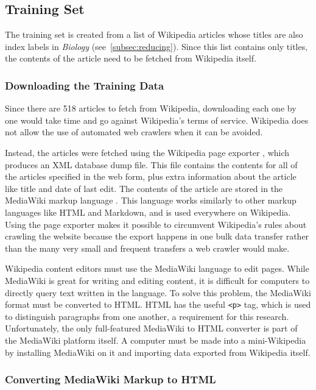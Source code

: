 \subsection{Training Set}
\label{subsec:training-set}

The training set is created from a list of Wikipedia articles whose titles are also index labels in {\it Biology} (see~\ref{subsec:reducing}).
Since this list contains only titles, the contents of the article need to be fetched from Wikipedia itself.

\subsubsection{Downloading the Training Data}

Since there are 518 articles to fetch from Wikipedia, downloading each one by one would take time and go against Wikipedia's terms of service. Wikipedia does not allow the use of automated web crawlers when it can be avoided\cite{wiki-robots}.

Instead, the articles were fetched using the Wikipedia page exporter \cite{wiki-exporter}, which produces an XML database dump file.
This file contains the contents for all of the articles specified in the web form, plus extra information about the article like title and date of last edit.
The contents of the article are stored in the MediaWiki markup language \cite{mediawiki-markup}.
This language works similarly to other markup languages like HTML and Markdown, and is used everywhere on Wikipedia.
Using the page exporter makes it possible to circumvent Wikipedia's rules about crawling the website because the export happens in one bulk data transfer rather than the many very small and frequent transfers a web crawler would make.

Wikipedia content editors must use the MediaWiki language to edit pages. 
While MediaWiki is great for writing and editing content, it is difficult for computers to directly query text written in the language.
To solve this problem, the MediaWiki format must be converted to HTML.
HTML has the useful {\tt <p>} tag, which is used to distinguish paragraphs from one another, a requirement for this research. 
Unfortunately, the only full-featured MediaWiki to HTML converter is part of the MediaWiki platform itself.
A computer must be made into a mini-Wikipedia by installing MediaWiki on it and importing data exported from Wikipedia itself.

\subsubsection{Converting MediaWiki Markup to HTML}

